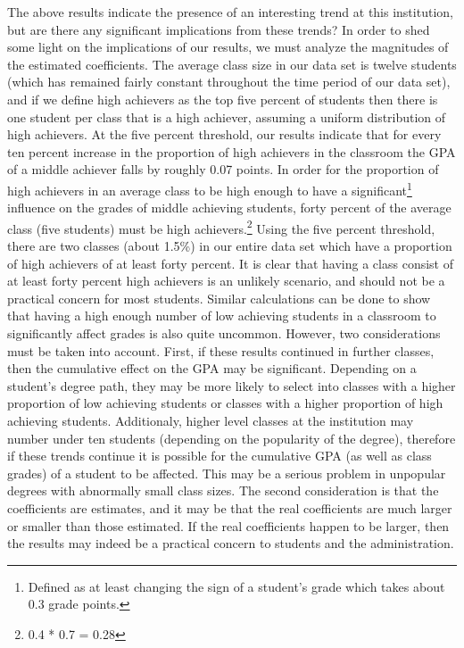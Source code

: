 The above results indicate the presence of an interesting trend at this institution, but are there any significant implications from these trends?
 In order to shed some light on the implications of our results, we must analyze the magnitudes of the estimated coefficients. 
The average class size in our data set is twelve students (which has remained fairly constant throughout the time period of our data set), and if we define high achievers as the top five percent of students then there is one student per class that is a high achiever,  assuming a uniform distribution of high achievers. 
At the five percent threshold, our results indicate that for every ten percent increase in the proportion of high achievers in the classroom the GPA of a middle achiever falls by roughly 0.07 points. 
In order for the proportion of high achievers in an average class to be high enough to have a significant\footnote{Defined as at least changing the sign of a student's grade which takes about 0.3 grade points.} influence on the grades of middle achieving students, forty percent of the average class (five students) must be high achievers.\footnote{0.4 * 0.7 = 0.28} Using the five percent threshold, there are two classes (about 1.5\%) in our entire data set which have a proportion of high achievers of at least forty percent. 
It is clear that having a class consist of at least forty percent high achievers is an unlikely scenario, and should not be a practical concern for most students. 
Similar calculations can be done to show that having a high enough number of low achieving students in a classroom to significantly affect grades is also quite uncommon. 
However, two considerations must be taken into account. 
First, if these results continued in further classes, then the cumulative effect on the GPA may be significant. 
Depending on a student's degree path, they may be more likely to select into classes with a higher proportion of low achieving students or classes with a higher proportion of high achieving students. 
Additionaly, higher level classes at the institution may number under ten students (depending on the popularity of the degree), therefore if these trends continue it is possible for the cumulative GPA (as well as class grades) of a student to be affected. 
This may be a serious problem in unpopular degrees with abnormally small class sizes. 
The second consideration is that the coefficients are estimates, and it may be that the real coefficients are much larger or smaller than those estimated. 
If the real coefficients happen to be larger, then the results may indeed be a practical concern to students and the administration.

